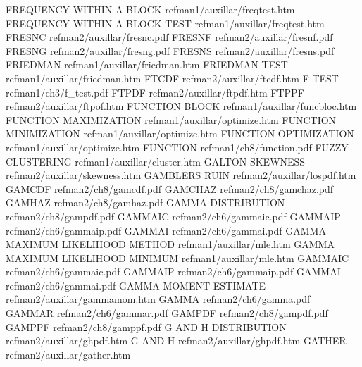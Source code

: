 FREQUENCY WITHIN A BLOCK                refman1/auxillar/freqtest.htm
FREQUENCY WITHIN A BLOCK TEST           refman1/auxillar/freqtest.htm
FRESNC                                  refman2/auxillar/fresnc.pdf
FRESNF                                  refman2/auxillar/fresnf.pdf
FRESNG                                  refman2/auxillar/fresng.pdf
FRESNS                                  refman2/auxillar/fresns.pdf
FRIEDMAN                                refman1/auxillar/friedman.htm
FRIEDMAN TEST                           refman1/auxillar/friedman.htm
FTCDF                                   refman2/auxillar/ftcdf.htm
F TEST                                  refman1/ch3/f_test.pdf
FTPDF                                   refman2/auxillar/ftpdf.htm
FTPPF                                   refman2/auxillar/ftpof.htm
FUNCTION BLOCK                          refman1/auxillar/funcbloc.htm
FUNCTION MAXIMIZATION                   refman1/auxillar/optimize.htm
FUNCTION MINIMIZATION                   refman1/auxillar/optimize.htm
FUNCTION OPTIMIZATION                   refman1/auxillar/optimize.htm
FUNCTION                                refman1/ch8/function.pdf
FUZZY CLUSTERING                        refman1/auxillar/cluster.htm
GALTON SKEWNESS                         refman2/auxillar/skewness.htm
GAMBLERS RUIN                           refman2/auxillar/lospdf.htm
GAMCDF                                  refman2/ch8/gamcdf.pdf
GAMCHAZ                                 refman2/ch8/gamchaz.pdf
GAMHAZ                                  refman2/ch8/gamhaz.pdf
GAMMA DISTRIBUTION                      refman2/ch8/gampdf.pdf
GAMMAIC                                 refman2/ch6/gammaic.pdf
GAMMAIP                                 refman2/ch6/gammaip.pdf
GAMMAI                                  refman2/ch6/gammai.pdf
GAMMA MAXIMUM LIKELIHOOD METHOD         refman1/auxillar/mle.htm
GAMMA MAXIMUM LIKELIHOOD MINIMUM        refman1/auxillar/mle.htm
GAMMAIC                                 refman2/ch6/gammaic.pdf
GAMMAIP                                 refman2/ch6/gammaip.pdf
GAMMAI                                  refman2/ch6/gammai.pdf
GAMMA MOMENT ESTIMATE                   refman2/auxillar/gammamom.htm
GAMMA                                   refman2/ch6/gamma.pdf
GAMMAR                                  refman2/ch6/gammar.pdf
GAMPDF                                  refman2/ch8/gampdf.pdf
GAMPPF                                  refman2/ch8/gamppf.pdf
G AND H DISTRIBUTION                    refman2/auxillar/ghpdf.htm
G AND H                                 refman2/auxillar/ghpdf.htm
GATHER                                  refman2/auxillar/gather.htm
